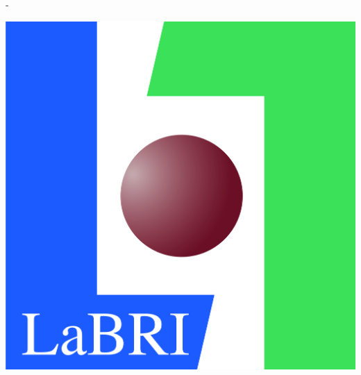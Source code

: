 \begin{titlingpage}
\begin{SingleSpace}
\begin{adjustwidth*}{\unitlength}{-\unitlength}
\begin{center}
\vspace{.3cm}
{\includegraphics[scale=.23]{logos/labri}}

\end{center}

\end{adjustwidth*}

\end{SingleSpace}
\end{titlingpage}
